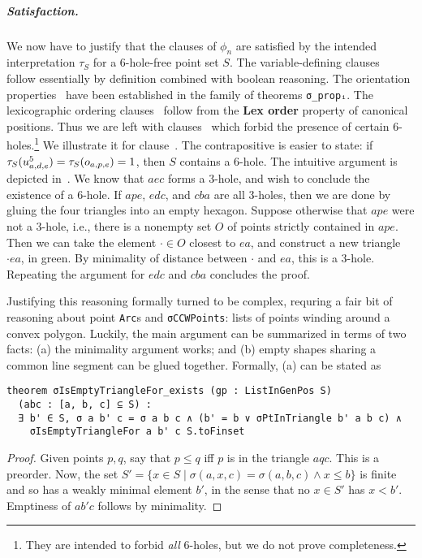 

\subparagraph*{Satisfaction.}
We now have to justify that the clauses of $\phi_n$
are satisfied by the intended interpretation $\tau_S$
for a $6$-hole-free point set $S$.
The variable-defining clauses~
follow essentially by definition combined with boolean reasoning.
The orientation properties~
have been established in the family of theorems \lstinline|σ_propᵢ|.
The lexicographic ordering clauses~
follow from the \textbf{Lex order} property of canonical positions.
Thus we are left with clauses~
which forbid the presence of certain $6$-holes.\footnote{
They are intended to forbid \emph{all} $6$-holes,
but we do not prove completeness.}
We illustrate it for clause~.
The contrapositive is easier to state:
if $\tau_S(\ufvar_{a,d,e}) = \tau_S(\orvar_{a,p,e}) = 1$,
then $S$ contains a $6$-hole.
The intuitive argument is depicted in~.
We know that $aec$ forms a $3$-hole,
and wish to conclude the existence of a $6$-hole.
If $ape$, $edc$, and $cba$ are all $3$-holes,
then we are done
by gluing the four triangles into an empty hexagon.
Suppose otherwise that $ape$ were not a $3$-hole,
i.e., there is a nonempty set $O$
of points strictly contained in $ape$.
Then we can take the element $\cdot \in O$ closest to $ea$,
and construct a new triangle $\cdot ea$, in green.
By minimality of distance between $\cdot$ and $ea$,
this is a $3$-hole.
Repeating the argument for $edc$ and $cba$ concludes the proof.

Justifying this reasoning formally
turned to be complex,
requring a fair bit of reasoning about point \lstinline|Arc|s
and \lstinline|σCCWPoints|: lists of points winding around a convex polygon.
Luckily, the main argument can be summarized in terms of two facts:
(a) the minimality argument works; and
(b) empty shapes sharing a common line segment can be glued together.
Formally, (a) can be stated as

\begin{lstlisting}
theorem σIsEmptyTriangleFor_exists (gp : ListInGenPos S)
  (abc : [a, b, c] ⊆ S) :
  ∃ b' ∈ S, σ a b' c = σ a b c ∧ (b' = b ∨ σPtInTriangle b' a b c) ∧
    σIsEmptyTriangleFor a b' c S.toFinset
\end{lstlisting}
\begin{proof}
  Given points $p,q$, say that $p \leq q$ iff $p$ is in the triangle $aqc$.
  This is a preorder.
  Now, the set $S' = \{x \in S \mid \sigma(a,x,c) = \sigma(a,b,c) \wedge x \leq b\}$
  is finite and so has a weakly minimal element $b'$,
  in the sense that no $x \in S'$ has $x < b'$.
  Emptiness of $ab'c$ follows by minimality.
\end{proof}

